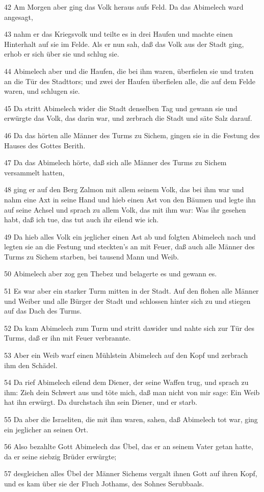 \par 42 Am Morgen aber ging das Volk heraus aufs Feld. Da das Abimelech ward angesagt,
\par 43 nahm er das Kriegsvolk und teilte es in drei Haufen und machte einen Hinterhalt auf sie im Felde. Als er nun sah, daß das Volk aus der Stadt ging, erhob er sich über sie und schlug sie.
\par 44 Abimelech aber und die Haufen, die bei ihm waren, überfielen sie und traten an die Tür des Stadttors; und zwei der Haufen überfielen alle, die auf dem Felde waren, und schlugen sie.
\par 45 Da stritt Abimelech wider die Stadt denselben Tag und gewann sie und erwürgte das Volk, das darin war, und zerbrach die Stadt und säte Salz darauf.
\par 46 Da das hörten alle Männer des Turms zu Sichem, gingen sie in die Festung des Hauses des Gottes Berith.
\par 47 Da das Abimelech hörte, daß sich alle Männer des Turms zu Sichem versammelt hatten,
\par 48 ging er auf den Berg Zalmon mit allem seinem Volk, das bei ihm war und nahm eine Axt in seine Hand und hieb einen Ast von den Bäumen und legte ihn auf seine Achsel und sprach zu allem Volk, das mit ihm war: Was ihr gesehen habt, daß ich tue, das tut auch ihr eilend wie ich.
\par 49 Da hieb alles Volk ein jeglicher einen Ast ab und folgten Abimelech nach und legten sie an die Festung und steckten's an mit Feuer, daß auch alle Männer des Turms zu Sichem starben, bei tausend Mann und Weib.
\par 50 Abimelech aber zog gen Thebez und belagerte es und gewann es.
\par 51 Es war aber ein starker Turm mitten in der Stadt. Auf den flohen alle Männer und Weiber und alle Bürger der Stadt und schlossen hinter sich zu und stiegen auf das Dach des Turms.
\par 52 Da kam Abimelech zum Turm und stritt dawider und nahte sich zur Tür des Turms, daß er ihn mit Feuer verbrannte.
\par 53 Aber ein Weib warf einen Mühlstein Abimelech auf den Kopf und zerbrach ihm den Schädel.
\par 54 Da rief Abimelech eilend dem Diener, der seine Waffen trug, und sprach zu ihm: Zieh dein Schwert aus und töte mich, daß man nicht von mir sage: Ein Weib hat ihn erwürgt. Da durchstach ihn sein Diener, und er starb.
\par 55 Da aber die Israeliten, die mit ihm waren, sahen, daß Abimelech tot war, ging ein jeglicher an seinen Ort.
\par 56 Also bezahlte Gott Abimelech das Übel, das er an seinem Vater getan hatte, da er seine siebzig Brüder erwürgte;
\par 57 desgleichen alles Übel der Männer Sichems vergalt ihnen Gott auf ihren Kopf, und es kam über sie der Fluch Jothams, des Sohnes Serubbaals.

